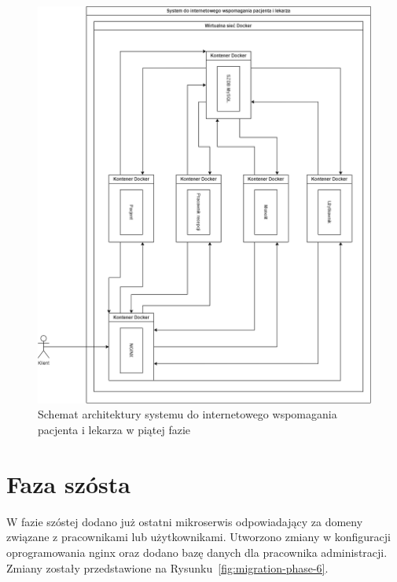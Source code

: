 \documentclass[12pt,twoside]{book}
\newcommand{\captionvspace}{\vspace{6pt}}
\begin{document}
\begin{figure}[ht]
\centering
\includegraphics[width=\textwidth]{includes/images/migration-phase-5.png}
\captionvspace
\caption{Schemat architektury systemu do internetowego wspomagania pacjenta i lekarza w piątej fazie}
\label{fig:migration-phase-5}
\end{figure}

\section{Faza szósta}
W fazie szóstej dodano już ostatni mikroserwis odpowiadający za domeny związane z pracownikami lub użytkownikami. Utworzono zmiany w konfiguracji oprogramowania nginx oraz dodano bazę danych dla pracownika administracji. Zmiany zostały przedstawione na Rysunku~\ref{fig:migration-phase-6}.
\end{document}
